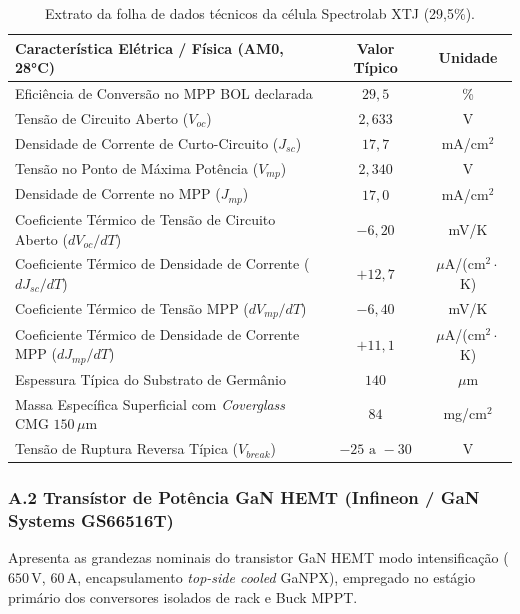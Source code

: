 \begin{table}[!ht]
\centering
\small
\renewcommand{\arraystretch}{0.85}
\caption{Extrato da folha de dados técnicos da célula Spectrolab XTJ (29,5\%).}
\label{tab:anexo_xtj_prime}
\begin{tabular}{lcc}
\hline
\textbf{Característica Elétrica / Física (AM0, 28°C)} & \textbf{Valor Típico} & \textbf{Unidade} \\ \hline
Eficiência de Conversão no MPP BOL declarada & $29{,}5$ & \% \\
Tensão de Circuito Aberto ($V_{oc}$) & $2{,}633$ & V \\
Densidade de Corrente de Curto-Circuito ($J_{sc}$) & $17{,}7$ & mA/cm$^2$ \\
Tensão no Ponto de Máxima Potência ($V_{mp}$) & $2{,}340$ & V \\
Densidade de Corrente no MPP ($J_{mp}$) & $17{,}0$ & mA/cm$^2$ \\
Coeficiente Térmico de Tensão de Circuito Aberto ($dV_{oc}/dT$) & $-6{,}20$ & mV/K \\
Coeficiente Térmico de Densidade de Corrente ($dJ_{sc}/dT$) & $+12{,}7$ & $\mu$A/(cm$^2\cdot$K) \\
Coeficiente Térmico de Tensão MPP ($dV_{mp}/dT$) & $-6{,}40$ & mV/K \\
Coeficiente Térmico de Densidade de Corrente MPP ($dJ_{mp}/dT$) & $+11{,}1$ & $\mu$A/(cm$^2\cdot$K) \\
Espessura Típica do Substrato de Germânio & $140$ & $\mu$m \\
Massa Específica Superficial com \textit{Coverglass} CMG $150\,\mu\text{m}$ & $84$ & mg/cm$^2$ \\
Tensão de Ruptura Reversa Típica ($V_{break}$) & $-25\text{ a }-30$ & V \\ \hline
\end{tabular}
\end{table}

\subsubsection*{A.2 Transístor de Potência GaN HEMT (Infineon / GaN Systems GS66516T)}
Apresenta as grandezas nominais do transistor GaN HEMT modo intensificação ($650\,\mathrm{V}$, $60\,\mathrm{A}$, encapsulamento \textit{top-side cooled} GaNPX), empregado no estágio primário dos conversores isolados de rack e Buck MPPT.

